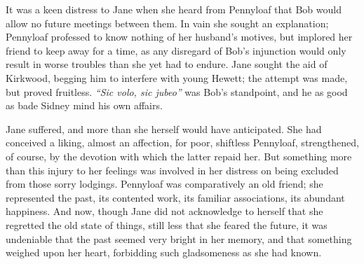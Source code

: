 It was a keen distress to Jane when she heard from Pennyloaf that Bob
would allow no future meetings between them. In vain she sought an
explanation; Pennyloaf professed to know nothing of her husband's
motives, but implored her friend to keep away for a time, as any
disregard of Bob's injunction would only result in worse troubles than
she yet had to endure. Jane sought the aid of Kirkwood, begging him to
interfere with young Hewett; the attempt was made, but proved fruitless.
\emph{``Sic volo, sic jubeo''} was Bob's standpoint, and he as good as
bade Sidney mind his own affairs.

{}Jane suffered, and more than she herself would have anticipated. She
had conceived a liking, almost an affection, for poor, shiftless
Pennyloaf, strengthened, of course, by the devotion with which the
latter repaid her. But something more than this injury to her feelings
was involved in her distress on being excluded from those sorry
lodgings. Pennyloaf was comparatively an old friend; she represented the
past, its contented work, its familiar associations, its abundant
happiness. And now, though Jane did not acknowledge to herself that she
regretted the old state of things, still less that she feared the
future, it was undeniable that the past seemed very bright in her
memory, and that something weighed upon her heart, forbidding such
gladsomeness as she had known.
